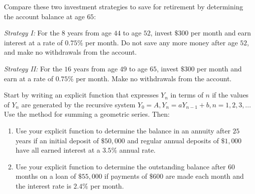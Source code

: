 \documentclass[10pt,]{book}
\theoremstyle{ptxdefinitionnotitle}
\theoremstyle{ptxdefinitiontitle}
\theoremstyle{ptxdefinitionnotitle}
\theoremstyle{ptxdefinitiontitle}
\theoremstyle{ptxdefinitionnotitle}
\theoremstyle{ptxdefinitiontitle}
\numberwithin{equation}{section}
\begin{document}
\begin{divisionexercise}{13}\hypertarget{exercise-44}{}
\hypertarget{p-185}{}%
Compare these two investment strategies to save for retirement by determining the account balance at age \(65\):%
\par
\hypertarget{p-186}{}%
\emph{Strategy I:} For the \(8\) years from age \(44\) to age \(52\), invest \(\$300\) per month and earn interest at a rate of \(0.75\%\) per month. Do not save any more money after age \(52\), and make no withdrawals from the account.%
\par
\hypertarget{p-187}{}%
\emph{Strategy II:} For the \(16\) years from age \(49\) to age \(65\), invest \(\$300\) per month and earn at a rate of \(0.75\%\) per month. Make no withdrawals from the account.%
\end{divisionexercise}%
\begin{divisionexercise}{14}\hypertarget{exercise-45}{}
\hypertarget{p-188}{}%
Start by writing an explicit function that expresses \(Y_n\) in terms of \(n\) if the values of \(Y_n\) are generated by the recursive system \(Y_0=A, Y_n=aY_{n-1}+b, n = 1, 2, 3, ...\) Use the method for summing a geometric series. Then:%
\leavevmode%
\begin{enumerate}[label=(\alph*)]
\item\hypertarget{li-97}{}Use your explicit function to determine the balance in an annuity after \(25\) years if an initial deposit of \(\$50,000\) and regular annual deposits of \(\$1,000\) have all earned interest at a \(3.5\%\) annual rate.%
\item\hypertarget{li-98}{}Use your explicit function to determine the outstanding balance after \(60\) months on a loan of \(\$55,000\) if payments of \(\$600\) are made each month and the interest rate is \(2.4\%\) per month.%
\end{enumerate}
\end{divisionexercise}%
\end{document}
